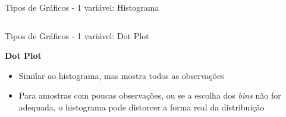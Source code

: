 \documentclass{beamer}\usepackage[]{graphicx}\usepackage[]{color}
\newenvironment{knitrout}{}{} %
\renewenvironment{knitrout}{\setlength{\topsep}{0mm}}{}
\begin{document}
\begin{frame}[fragile]{Tipos de Gráficos - 1 variável: Histograma}
\begin{columns}[t]
\begin{knitrout}
\end{knitrout}

\end{columns}

\end{frame}



\begin{frame}{Tipos de Gráficos - 1 variável: Dot Plot}

\textbf{Dot Plot}

\begin{itemize}
  \item Similar ao histograma, mas mostra todos as observações \pause
  \vfill
  \item  Para amostras com poucas observações, ou se a escolha dos \emph{bins} não for adequada, o histograma pode distorcer a forma real da distribuição
\end{itemize}


\end{frame} 
\end{document}

